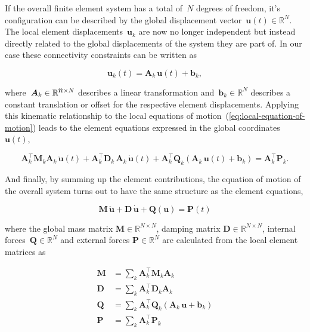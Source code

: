 If the overall finite element system has a total of~$N$ degrees of freedom, it's configuration can be described by the global displacement vector~$\boldsymbol{u}(t) \in \mathbb{R}^{N}$.
The local element displacements~$\boldsymbol{u}_{k}$ are now no longer independent but instead directly related to the global displacements of the system they are part of.
In our case these connectivity constraints can be written as

\begin{equation}
\boldsymbol{u}_{k}(t) = \boldsymbol{A}_{k}\,\boldsymbol{u}(t) + \boldsymbol{b}_{k},\label{eq:kinematics-local-global}
\end{equation}

where~$\boldsymbol{A}_{k} \in \mathbb{R}^{\mathlarger{n} \times N}$ describes a linear transformation and~$\boldsymbol{b}_{k} \in \mathbb{R}^{N}$ describes a constant translation or offset for the respective element displacements.
Applying this kinematic relationship to the local equations of motion~(\ref{eq:local-equation-of-motion}) leads to the element equations expressed in the global coordinates~$\boldsymbol{u}(t)$,

\begin{equation}
\boldsymbol{A}_{k}^\intercal\boldsymbol{M}_{k}\boldsymbol{A}_{k}\,\ddot{\boldsymbol{u}}(t) + \boldsymbol{A}_{k}^\intercal\boldsymbol{D}_{k}\,\boldsymbol{A}_{k}\,\dot{\boldsymbol{u}}(t) + \boldsymbol{A}_{k}^\intercal\boldsymbol{Q}_{k}(\boldsymbol{A}_{k}\,\boldsymbol{u}(t) + \boldsymbol{b}_{k}) = \boldsymbol{A}_{k}^\intercal\boldsymbol{P}_{k}.
\end{equation}

And finally, by summing up the element contributions, the equation of motion of the overall system turns out to have the same structure as the element equations,

\begin{equation}
\boldsymbol{M}\,\ddot{\boldsymbol{u}} + \boldsymbol{D}\,\dot{\boldsymbol{u}} + \boldsymbol{Q}(\boldsymbol{u}) = \boldsymbol{P}(t)\label{eq:global-equation-of-motion}
\end{equation}

where the global mass matrix $\boldsymbol{M} \in \mathbb{R}^{N \times N}$, damping matrix $\boldsymbol{D} \in \mathbb{R}^{N \times N}$, internal forces~$\boldsymbol{Q} \in \mathbb{R}^{N}$ and external forces $\boldsymbol{P} \in \mathbb{R}^{N}$ are calculated from the local element matrices as

\begin{align}
\boldsymbol{M} &= \sum_{k} \boldsymbol{A}_{k}^\intercal\boldsymbol{M}_{k}\boldsymbol{A}_{k} \\
\boldsymbol{D} &= \sum_{k} \boldsymbol{A}_{k}^\intercal\boldsymbol{D}_{k}\boldsymbol{A}_{k} \\
\boldsymbol{Q} &= \sum_{k} \boldsymbol{A}_{k}^\intercal\boldsymbol{Q}_{k}(\boldsymbol{A}_{k}\,\boldsymbol{u} + \boldsymbol{b}_{k}) \\
\boldsymbol{P} &= \sum_{k} \boldsymbol{A}_{k}^\intercal\boldsymbol{P}_{k}
\end{align}

